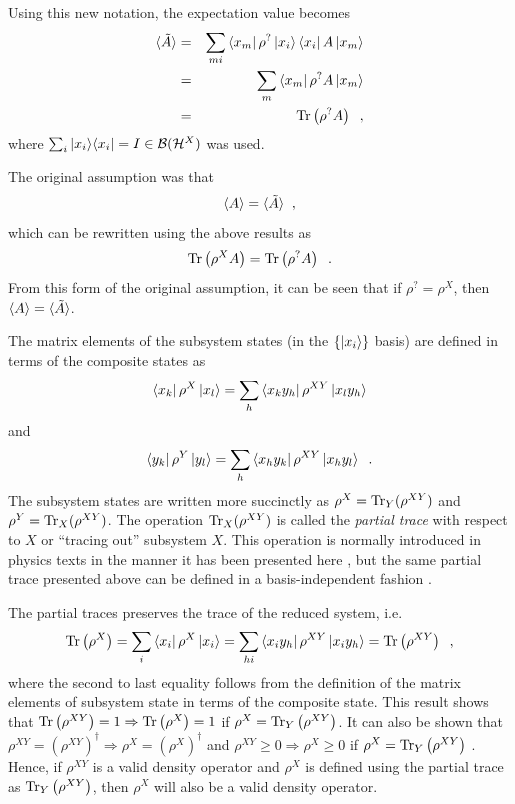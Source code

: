 Using this new notation, the expectation value becomes
\begin{eqnarray*}
\langle \tilde{A}\rangle &=& \sum_{mi} \left\langle x_m\right|\rho^{?} \left|x_i\right\rangle \left\langle x_i\right|A\left|x_m\right\rangle\\
&=& \sum_{m} \left\langle x_m\right|\rho^{?} A\left|x_m\right\rangle\\
&=& \operatorname{Tr}\left( \rho^{?} A\right)\;\;,
\end{eqnarray*}
where $\sum_i |x_i\rangle\langle x_i| = I\in\mathcal{B}(\mathcal{H}^X)$ was used.  

The original assumption was that 
$$
\langle A\rangle=\langle \tilde{A}\rangle\;\;,
$$
which can be rewritten using the above results as
$$
\operatorname{Tr}\left(\rho^X A\right) = \operatorname{Tr}\left( \rho^{?} A\right)\;\;.
$$
From this form of the original assumption, it can be seen that if $\rho^? = \rho^X$, then $\langle A\rangle=\langle \tilde{A}\rangle$.

The matrix elements of the subsystem states (in the $\{\left|x_i\right\rangle\}$ basis) are defined in terms of the composite states as
$$
\left\langle x_k\right|\rho^X\left|x_l\right\rangle=\sum_h \left\langle x_ky_h\right|\rho^{XY}\left|x_ly_h\right\rangle
$$
and
$$
\left\langle y_k\right|\rho^Y\left|y_l\right\rangle=\sum_h \left\langle x_hy_k\right|\rho^{XY}\left|x_hy_l\right\rangle\;\;.
$$
The subsystem states are written more succinctly as $\rho^X = \operatorname{Tr}_Y(\rho^{XY})$ and $\rho^Y = \operatorname{Tr}_X(\rho^{XY})$.  The operation $\operatorname{Tr}_X(\rho^{XY})$ is called the {\em partial trace} with respect to $X$ or ``tracing out'' subsystem $X$.  This operation is normally introduced in physics texts in the manner it has been presented here \cite{Cohen1992,Nielsen2010,Jacobs2013,Barnett2002}, but the same partial trace presented above can be defined in a basis-independent fashion \cite{Carlen2010}.  

The partial traces preserves the trace of the reduced system, i.e.\
$$
\operatorname{Tr}\left(\rho^X\right) = \sum_i \left\langle x_i\right|\rho^X\left|x_i\right\rangle = \sum_{hi} \left\langle x_iy_h\right|\rho^{XY}\left|x_iy_h\right\rangle = \operatorname{Tr}\left(\rho^{XY}\right)\;\;,
$$
where the second to last equality follows from the definition of the matrix elements of subsystem state in terms of the composite state.  This result shows that $\operatorname{Tr}\left(\rho^{XY}\right)=1\Rightarrow\operatorname{Tr}\left(\rho^X\right)=1$ if $\rho^X = \operatorname{Tr}_Y\left(\rho^{XY}\right)$.  It can also be shown that $\rho^{XY} = \left(\rho^{XY}\right)^\dagger\Rightarrow \rho^{X} = \left(\rho^{X}\right)^\dagger$ and $\rho^{XY}\ge 0\Rightarrow \rho^{X}\ge 0$ if $\rho^X = \operatorname{Tr}_Y\left(\rho^{XY}\right)$ \cite{Paris2012}.  Hence, if $\rho^{XY}$ is a valid density operator and $\rho^X$ is defined using the partial trace as $\operatorname{Tr}_Y\left(\rho^{XY}\right)$, then $\rho^X$ will also be a valid density operator.

